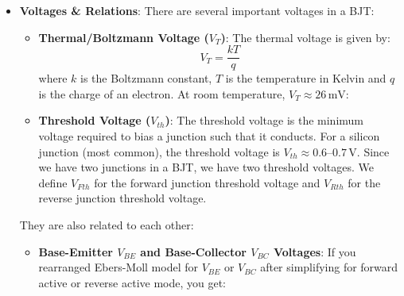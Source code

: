 \begin{itemize}
\begin{itemize}
\begin{align*}
          g_m &= \left[ I_S e^{\frac{V_{BE}}{V_T}} \times \frac{1}{V_T} \right] \\
          g_m &= \frac{I_C}{V_T} \hspace{1cm}
        \end{align*}
        \(g_o\) can be calculated as follows:
        \begin{align*}
          g_o &= \frac{dI_C}{dV_{CE}} |_{V_{BE(Q)}} \\
          g_o &= \frac{d}{dV_{CE}} \left[ I_S \left( e^{\frac{V_{BE}}{V_T}} - 1 \right) \left( 1 + \frac{V_{CE}}{V_A} \right) \right] |_{V_{BE(Q)}} \\
          g_o &= \left[ I_S \left(e^{\frac{V_{BE}}{V_T}} - 1 \right) \times \frac{1}{V_A} \right] \\
          g_o &= \frac{I_C}{V_A} \hspace{1cm}
        \end{align*}
    \end{itemize}
  \item \textbf{Voltages \& Relations}:
    There are several important voltages in a BJT:\
    \begin{itemize}
      \item \textbf{Thermal/Boltzmann Voltage (\(V_T\))}:
        The thermal voltage is given by:
        \[
          V_T = \frac{kT}{q}
        \]
        where \(k\) is the Boltzmann constant, \(T\) is the temperature in
        Kelvin and \(q\) is the charge of an electron. At room temperature,
        \(V_T \approx 26\,\mathrm{mV}\):
      \item \textbf{Threshold Voltage (\(V_{th}\))}:
        The threshold voltage is the minimum voltage required to bias a junction
        such that it conducts. For a silicon junction (most common), the
        threshold voltage is \(V_{th} \approx 0.6\text{--}0.7\,\mathrm{V}\).
        Since we have two junctions in a BJT, we have two threshold voltages.
        We define \(V_{Fth}\) for the forward junction threshold voltage and
        \(V_{Rth}\) for the reverse junction threshold voltage.
    \end{itemize}
    They are also related to each other:
    \begin{itemize}
      \item \textbf{Base-Emitter \(V_{BE}\) and Base-Collector \(V_{BC}\) Voltages}:
        If you rearranged Ebers-Moll model for \(V_{BE}\) or \(V_{BC}\) after
        simplifying for forward active or reverse active mode, you get:
        \begin{itemize}

\end{itemize}
\end{itemize}
\end{itemize}
